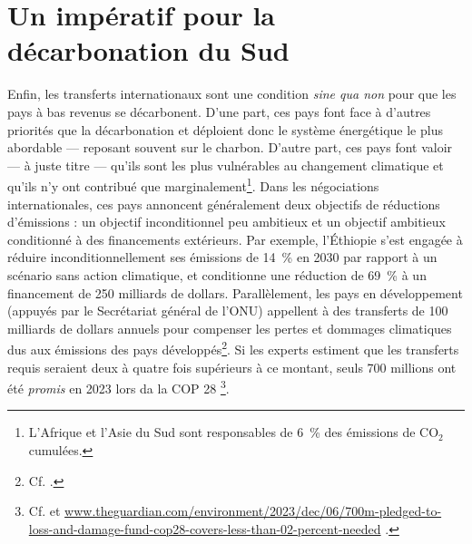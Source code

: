 \documentclass[a5paper,french,openany]{memoir}
\begin{document}
\section{Un impératif pour la décarbonation du Sud}
Enfin, les transferts internationaux sont une condition \textit{sine qua non} pour que les pays à bas revenus se décarbonent. D'une part, ces pays font face à d'autres priorités que la décarbonation et déploient donc le système énergétique le plus abordable --- reposant souvent sur le charbon. D'autre part, ces pays font valoir --- à juste titre --- qu'ils sont les plus vulnérables au changement climatique et qu'ils n'y ont contribué que marginalement\footnote{L'Afrique et l'Asie du Sud sont responsables de 6~\% des émissions de CO$_\text{2}$ cumulées. %
}. Dans les négociations internationales, ces pays annoncent généralement deux objectifs de réductions d'émissions : un objectif inconditionnel peu ambitieux et un objectif ambitieux conditionné à des financements extérieurs. Par exemple, l'Éthiopie s'est engagée à réduire inconditionnellement ses émissions de 14~\% en 2030 par rapport à un scénario sans action climatique, et conditionne une réduction de 69~\% à un financement de 250 milliards de dollars. %
Parallèlement, les pays en développement (appuyés par le Secrétariat général de l'ONU) appellent à des transferts de 100 milliards de dollars annuels pour compenser les pertes et dommages climatiques dus aux émissions des pays développés\footnote{Cf. \cite{tc_proposal_2023,sgnu_bridgetown_2023}.}. Si les experts estiment que les transferts requis seraient deux à quatre fois supérieurs à ce montant, seuls 700 millions ont été \textit{promis} en 2023 lors da la COP 28%
\footnote{Cf. \cite{songwe_climate_2023,markandya_integrated_2019,robinson_valuing_2021} et \href{https://www.theguardian.com/environment/2023/dec/06/700m-pledged-to-loss-and-damage-fund-cop28-covers-less-than-02-percent-needed}{www.theguardian.com/environment/2023/dec/06/700m-pledged-to-loss-and-damage-fund-cop28-covers-less-than-02-percent-needed}%
.}.
\end{document}
